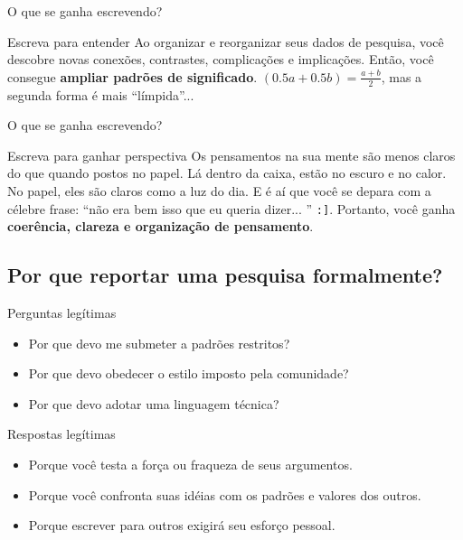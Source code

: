 \begin{frame}{O que se ganha escrevendo?}
\begin{block}{Escreva para entender}
Ao organizar e reorganizar seus dados de pesquisa, você descobre novas conexões, contrastes, complicações e implicações. Então, você consegue \textbf{ampliar padrões de significado}. $(0.5a + 0.5b) = \frac{a+b}{2}$, mas a segunda forma é mais ``límpida''...
\end{block}
\end{frame}


\begin{frame}{O que se ganha escrevendo?}
\begin{block}{Escreva para ganhar perspectiva}
Os pensamentos na sua mente são menos claros do que quando postos no papel. Lá dentro da caixa, estão no escuro e no calor. No papel, eles são claros como a luz do dia. E é aí que você se depara com a célebre frase: ``não era bem isso que eu queria dizer... '' \texttt{:]}. Portanto, você ganha \textbf{coerência, clareza e organização de pensamento}. 
\end{block}
\end{frame}


\subsection*{Por que reportar uma pesquisa formalmente?}

\begin{frame}{Perguntas legítimas}
\begin{itemize}
\item Por que devo me submeter a padrões restritos? 
\item Por que devo obedecer o estilo imposto pela comunidade?
\item Por que devo adotar uma linguagem técnica? 
\end{itemize}
\end{frame}


\begin{frame}{Respostas legítimas}
\begin{itemize}
\item Porque você testa a força ou fraqueza de seus argumentos.
\item Porque você confronta suas idéias com os padrões e valores dos outros.
\item Porque escrever para outros exigirá seu esforço pessoal.
\end{itemize}
\end{frame}


